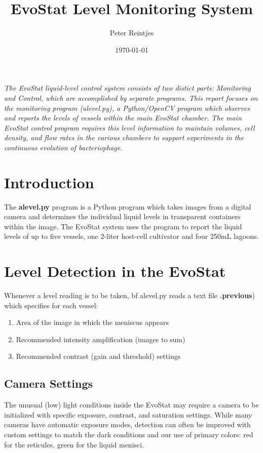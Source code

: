 \documentclass[10pt,letterpaper]{article}
\date{}
\begin{document}
\title{EvoStat Level Monitoring System}
\author{Peter Reintjes}
\date{\today}
\maketitle

\vspace*{0.2in}
\begin{flushleft}
\texttt{[image: \{phagestat]}.jpg}
\end{flushleft}

{\it The EvoStat liquid-level control system consists of two distict parts: Monitoring and Control, which are accomplished by separate programs.  This report focuses on the monitoring program (alevel.py), a Python/OpenCV\cite{opencv} program which observes and reports the levels of vessels within the main EvoStat chamber.  The main EvoStat control program requires this level information to maintain volumes, cell density, and flow rates in the various chambers to support experiments in the continuous evolution of bacteriophage\cite{pace}.}

\section*{Introduction}

The {\bf alevel.py} program is a Python program which takes images from a digital camera and determines the individual liquid levels in transparent containers within the image.  The EvoStat system uses the program to report the liquid levels of up to five vessels, one 2-liter host-cell cultivator and four 250mL lagoons.

\section*{Level Detection in the EvoStat}
Whenever a level reading is to be taken, {bf alevel.py} reads a text file {\bf .previous}) which specifies for each vessel:

\begin{enumerate}[itemsep=1pt, topsep=2pt, partopsep=0pt]
\item Area of the image in which the meniscus appears
\item Recommended intensity amplification (images to sum)
\item Recommended contrast (gain and threshold) settings
\end{enumerate}

\subsection*{Camera Settings}
The unusual (low) light conditions inside the EvoStat may require a camera to be initialized with specific exposure, contrast, and saturation settings. While many cameras have automatic exposure modes, detection can often be improved with custom settings to match the dark conditions and our use of primary colors: red for the reticules, green for the liquid menisci.
\end{document}
